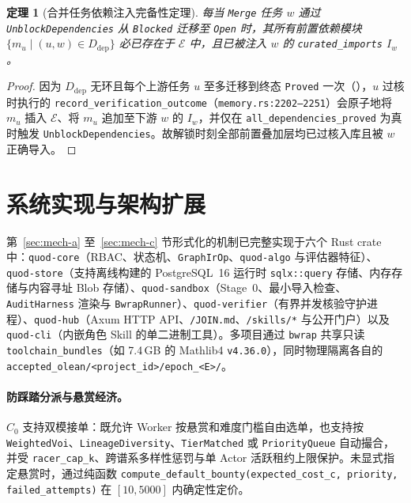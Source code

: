 \documentclass[10pt,a4paper,fontset=fandol]{ctexart}
\newtheorem{theorem}{定理}[section]
\newcommand{\Truth}{\mathcal{E}}
\newcommand{\code}[1]{\texttt{#1}}
\begin{document}
\begin{theorem}[合并任务依赖注入完备性定理]\label{thm:merge-unlock}
每当 \code{Merge} 任务 $w$ 通过 \code{Unblock\-Dependencies} 从 \code{Blocked} 迁移至 \code{Open} 时，其所有前置依赖模块 $\{m_u \mid (u, w) \in D_{\mathrm{dep}}\}$ 必已存在于 $\Truth$ 中，且已被注入 $w$ 的 \code{curated\_\-imports} $I_w$。
\end{theorem}

\begin{proof}
因为 $D_{\mathrm{dep}}$ 无环且每个上游任务 $u$ 至多迁移到终态 \code{Proved} 一次（），$u$ 过核时执行的 \code{record\_\-verification\_\-outcome}（\code{memory.rs:2202--2251}）会原子地将 $m_u$ 插入 $\Truth$、将 $m_u$ 追加至下游 $w$ 的 $I_w$，并仅在 \code{all\_\-dependencies\_\-proved} 为真时触发 \code{Unblock\-Dependencies}。故解锁时刻全部前置叠加层均已过核入库且被 $w$ 正确导入。
\end{proof}

\section{系统实现与架构扩展}\label{sec:impl}

第~\ref{sec:mech-a} 至~\ref{sec:mech-c} 节形式化的机制已完整实现于六个 Rust crate 中：\code{quod-core}（RBAC、状态机、\code{GraphIrOp}、\code{quod-algo} 与评估器特征）、\code{quod-store}（支持离线构建的 PostgreSQL~16 运行时 \code{sqlx::query} 存储、内存存储与内容寻址 Blob 存储）、\code{quod-sandbox}（Stage~0、最小导入检查、\code{AuditHarness} 渲染与 \code{BwrapRunner}）、\code{quod-verifier}（有界并发核验守护进程）、\code{quod-hub}（Axum HTTP API、\code{/JOIN.md}、\code{/skills/*} 与公开门户）以及 \code{quod-cli}（内嵌角色 Skill 的单二进制工具）。多项目通过 \code{bwrap} 共享只读 \code{toolchain\_bundles}（如 7.4\,GB 的 Mathlib4 \code{v4.36.0}），同时物理隔离各自的 \code{accepted\_\-olean/\-<project\_id>/\-epoch\_<E>/}。

\paragraph{防踩踏分派与悬赏经济。}
$C_0$ 支持双模接单：既允许 Worker 按悬赏和难度门槛自由选单，也支持按 \code{WeightedVoi}、\code{LineageDiversity}、\code{TierMatched} 或 \code{PriorityQueue} 自动撮合，并受 \code{racer\_cap\_k}、跨谱系多样性惩罚与单 Actor 活跃租约上限保护。未显式指定悬赏时，通过纯函数 \code{compute\_\-default\_\-bounty(\-expected\_cost\_c,\; priority,\; failed\_attempts)} 在 $[10, 5000]$ 内确定性定价。
\end{document}
